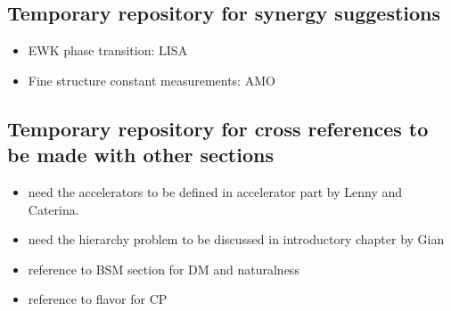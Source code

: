 \newpage
\subsection{Temporary repository for synergy suggestions}

\begin{itemize}
    \item EWK phase transition: LISA
    \item Fine structure constant measurements: AMO
\end{itemize}

\subsection{Temporary repository for cross references to be made with other sections}

\begin{itemize}
    \item need the accelerators to be defined in accelerator part by Lenny and Caterina.
    \item need the hierarchy problem to be discussed in introductory chapter by Gian
    \item reference to BSM section for DM and naturalness
    \item reference to flavor for CP
\end{itemize}

%

